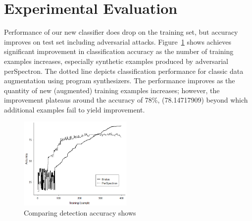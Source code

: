 \section{Experimental Evaluation}\label{results}












 Performance of our new classifier does drop on the training set, but accuracy improves on test set including adversarial attacks. Figure~\ref{fig:accuracy} shows \scheme achieves significant improvement in classification accuracy as the number of training examples increases, especially synthetic examples produced by adversarial perSpectron. The dotted line depicts classification performance for classic data augmentation using program synthesizers. The performance improves as the quantity of new (augmented) training examples increases; however, the improvement plateaus around the accuracy of 78\%, (78.14717909)
 beyond which additional examples fail to yield improvement.
 
\begin{figure}[ht!] 
\centering
\includegraphics[width=0.49\textwidth]{PerSpectron-Micro2020-camera-R/img/adverse88.png}
\vspace*{-4mm}
\caption{Comparing detection accuracy shows 
  \scheme{} 
}
\label{fig:accuracy}
\end{figure}

